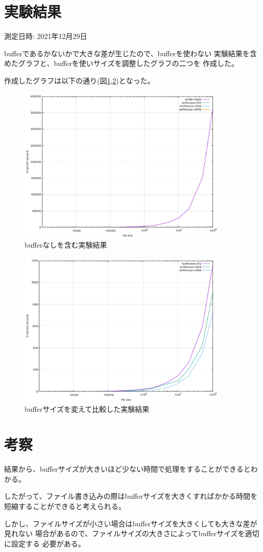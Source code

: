 \documentclass[a4paper,11pt,titlepage]{jsarticle}
\begin{document}
\section{実験結果}
測定日時: 2021年12月29日

bufferであるかないかで大きな差が生じたので、bufferを使わない
実験結果を含めたグラフと、bufferを使いサイズを調整したグラフの二つを
作成した。

作成したグラフは以下の通り(図\ref{1},\ref{2})となった。

\begin{figure}[H]
    \centering
    \includegraphics[width=100mm]{./results/buff_and_not.pdf}
    \caption{bufferなしを含む実験結果}
    \label{1}
\end{figure}

\begin{figure}[H]
    \centering
    \includegraphics[width=100mm]{./results/buff_only.pdf}
    \caption{bufferサイズを変えて比較した実験結果}
    \label{2}
\end{figure}

\section{考察}
結果から、bufferサイズが大きいほど少ない時間で処理をすることができるとわかる。

したがって、ファイル書き込みの際はbufferサイズを大きくすればかかる時間を
短縮することができると考えられる。

しかし、ファイルサイズが小さい場合はbufferサイズを大きくしても大きな差が見れない
場合があるので、ファイルサイズの大きさによってbufferサイズを適切に設定する
必要がある。
\end{document}
